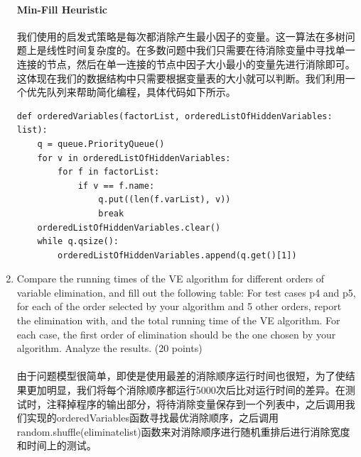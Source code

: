 \documentclass[a4paper, 11pt]{article}
\begin{document}
\begin{enumerate}
\paragraph{Min-Fill Heuristic}
我们使用的启发式策略是每次都消除产生最小因子的变量。这一算法在多树问题上是线性时间复杂度的。在多数问题中我们只需要在待消除变量中寻找单一连接的节点，然后在单一连接的节点中因子大小最小的变量先进行消除即可。这体现在我们的数据结构中只需要根据变量表的大小就可以判断。我们利用一个优先队列来帮助简化编程，具体代码如下所示。
\newline
{}
\begin{lstlisting}
def orderedVariables(factorList, orderedListOfHiddenVariables: list):
    q = queue.PriorityQueue()
    for v in orderedListOfHiddenVariables:
        for f in factorList:
            if v == f.name:
                q.put((len(f.varList), v))
                break
    orderedListOfHiddenVariables.clear()
    while q.qsize():
        orderedListOfHiddenVariables.append(q.get()[1])

\end{lstlisting}

\item Compare the running times of the VE algorithm for different orders of variable elimination, and fill out the following table: For test cases p4 and p5, for each of the order selected by your algorithm and 5 other orders, report the elimination with, and the total running time of the VE algorithm. For each case, the first order of elimination should be the one chosen by your algorithm. Analyze the results. (20 points)
\paragraph{} 由于问题模型很简单，即使是使用最差的消除顺序运行时间也很短，为了使结果更加明显，我们将每个消除顺序都运行5000次后比对运行时间的差异。在测试时，注释掉程序的输出部分，将待消除变量保存到一个列表中，之后调用我们实现的orderedVariables函数寻找最优消除顺序，之后调用random.shuffle(eliminatelist)函数来对消除顺序进行随机重排后进行消除宽度和时间上的测试。


\end{enumerate}
\end{document}
